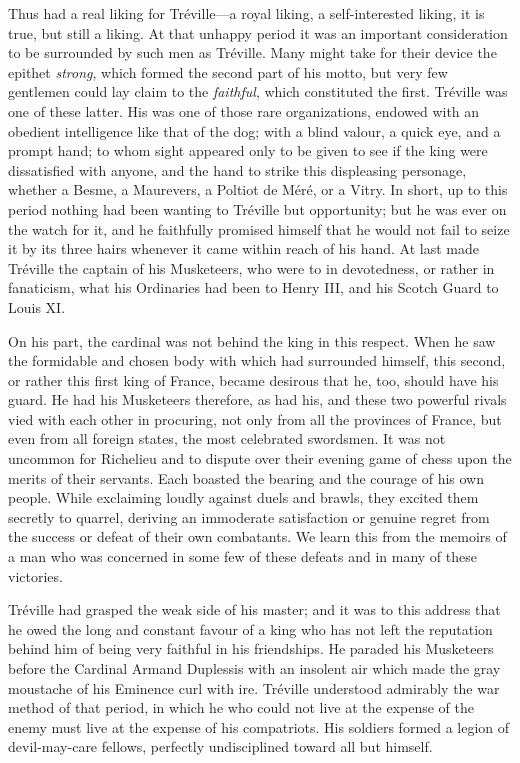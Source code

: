 Thus  had a real liking for Tréville—a royal liking, a self-interested liking, it is true, but still a liking. At that unhappy period it was an important consideration to be surrounded by such men as Tréville. Many might take for their device the epithet \emph{strong}, which formed the second part of his motto, but very few gentlemen could lay claim to the \emph{faithful}, which constituted the first. Tréville was one of these latter. His was one of those rare organizations, endowed with an obedient intelligence like that of the dog; with a blind valour, a quick eye, and a prompt hand; to whom sight appeared only to be given to see if the king were dissatisfied with anyone, and the hand to strike this displeasing personage, whether a Besme, a Maurevers, a Poltiot de Méré, or a Vitry. In short, up to this period nothing had been wanting to Tréville but opportunity; but he was ever on the watch for it, and he faithfully promised himself that he would not fail to seize it by its three hairs whenever it came within reach of his hand. At last  made Tréville the captain of his Musketeers, who were to  in devotedness, or rather in fanaticism, what his Ordinaries had been to Henry III, and his Scotch Guard to Louis XI. 

On his part, the cardinal was not behind the king in this respect. When he saw the formidable and chosen body with which  had surrounded himself, this second, or rather this first king of France, became desirous that he, too, should have his guard. He had his Musketeers therefore, as  had his, and these two powerful rivals vied with each other in procuring, not only from all the provinces of France, but even from all foreign states, the most celebrated swordsmen. It was not uncommon for Richelieu and  to dispute over their evening game of chess upon the merits of their servants. Each boasted the bearing and the courage of his own people. While exclaiming loudly against duels and brawls, they excited them secretly to quarrel, deriving an immoderate satisfaction or genuine regret from the success or defeat of their own combatants. We learn this from the memoirs of a man who was concerned in some few of these defeats and in many of these victories. 

Tréville had grasped the weak side of his master; and it was to this address that he owed the long and constant favour of a king who has not left the reputation behind him of being very faithful in his friendships. He paraded his Musketeers before the Cardinal Armand Duplessis with an insolent air which made the gray moustache of his Eminence curl with ire. Tréville understood admirably the war method of that period, in which he who could not live at the expense of the enemy must live at the expense of his compatriots. His soldiers formed a legion of devil-may-care fellows, perfectly undisciplined toward all but himself. 

